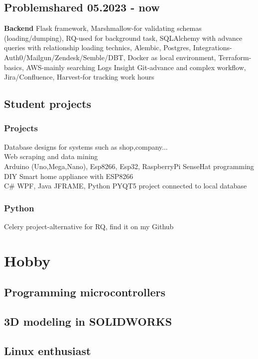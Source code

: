 \documentclass[10pt]{article}
\begin{document}
\subsection{{\textbf{Problemshared} 05.2023 - now}}
\textbf{Backend} Flask framework,
Marshmallow-for validating schemas (loading/dumping),
RQ-used for background task,
SQLAlchemy with advance queries with relationship loading technics,
Alembic,
Postgres,
Integrations-Auth0/Mailgun/Zendesk/Semble/DBT,
Docker as local environment,
Terraform-basics,
AWS-mainly searching Logs Insight
Git-advance and complex workflow,
Jira/Confluence,
Harvest-for tracking work hours

\subsection{\textbf{Student projects}}
\subsubsection{Projects}
Database designs for systems such as shop,company...\\
Web scraping and data mining\\
Arduino (Uno,Mega,Nano), Esp8266, Esp32, RaspberryPi SenseHat programming\\
DIY Smart home appliance with ESP8266 \\
C{\#} WPF, Java JFRAME, Python PYQT5 project connected to local database\\
\subsubsection{Python}
Celery project-alternative for RQ, find it on my Github

\section{Hobby}
\subsection{Programming microcontrollers}
\subsection{3D modeling in SOLIDWORKS}
\subsection{Linux enthusiast}
\end{document}
